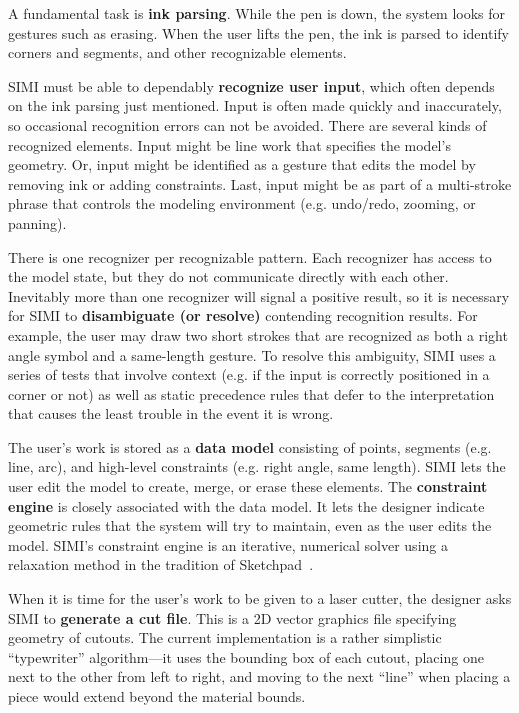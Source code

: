 A fundamental task is \textbf{ink parsing}. While the pen is down, the
system looks for gestures such as erasing. When the user lifts the
pen, the ink is parsed to identify corners and segments, and other
recognizable elements.

SIMI must be able to dependably \textbf{recognize user input}, which
often depends on the ink parsing just mentioned. Input is often made
quickly and inaccurately, so occasional recognition errors can not be
avoided. There are several kinds of recognized elements. Input might
be line work that specifies the model's geometry. Or, input might be
identified as a gesture that edits the model by removing ink or adding
constraints. Last, input might be as part of a multi-stroke phrase
that controls the modeling environment (e.g. undo/redo, zooming, or
panning).

There is one recognizer per recognizable pattern. Each recognizer has
access to the model state, but they do not communicate directly with
each other. Inevitably more than one recognizer will signal a positive
result, so it is necessary for SIMI to \textbf{disambiguate (or
  resolve)} contending recognition results. For example, the user may
draw two short strokes that are recognized as both a right angle
symbol and a same-length gesture. To resolve this ambiguity, SIMI uses
a series of tests that involve context (e.g. if the input is correctly
positioned in a corner or not) as well as static precedence rules that
defer to the interpretation that causes the least trouble in the event
it is wrong.

The user's work is stored as a \textbf{data model} consisting of
points, segments (e.g. line, arc), and high-level constraints
(e.g. right angle, same length). SIMI lets the user edit the model to
create, merge, or erase these elements. The \textbf{constraint engine}
is closely associated with the data model. It lets the designer
indicate geometric rules that the system will try to maintain, even as
the user edits the model. SIMI's constraint engine is an iterative,
numerical solver using a relaxation method in the tradition of
Sketchpad~\cite{sutherland-sketchpad}.

When it is time for the user's work to be given to a laser cutter, the
designer asks SIMI to \textbf{generate a cut file}. This is a 2D vector
graphics file specifying geometry of cutouts. The current
implementation is a rather simplistic ``typewriter'' algorithm---it
uses the bounding box of each cutout, placing one next to the other
from left to right, and moving to the next ``line'' when placing a
piece would extend beyond the material bounds.

